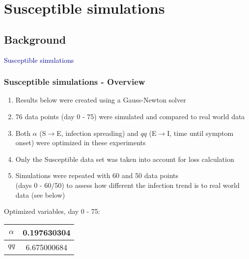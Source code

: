 \documentclass{beamer}
\begin{document}
\section{Susceptible simulations}
\subsection{Background}
\begin{frame}
	\centering
	\textcolor{darkblue}{\huge{Susceptible simulations}}
\end{frame}
\begin{frame}
	\frametitle{Susceptible simulations - Overview}
	\begin{enumerate}[$\bullet$]
		\item Results below were created using a Gauss-Newton solver
		\item 76 data points (day 0 - 75) were simulated and compared to real world data
		\item Both $\alpha$ (S$\rightarrow$E, infection spreading) and $qq$ (E$\rightarrow$I, time until symptom onset) were optimized in these experiments
		\item Only the Susceptible data set was taken into account for loss calculation
		\item Simulations were repeated with 60 and 50 data points\\(days 0 - 60/50) to assess how different the infection trend is to real world data (see below)
	\end{enumerate}
	\begin{center}
	Optimized variables, day 0 - 75:
	\begin{tabular}{|c|c|}
		\hline $\alpha$ & 0.197630304 \\
		\hline $qq$ & 6.675000684 \\ \hline
	\end{tabular}
	\end{center}
\end{frame}
\end{document}
